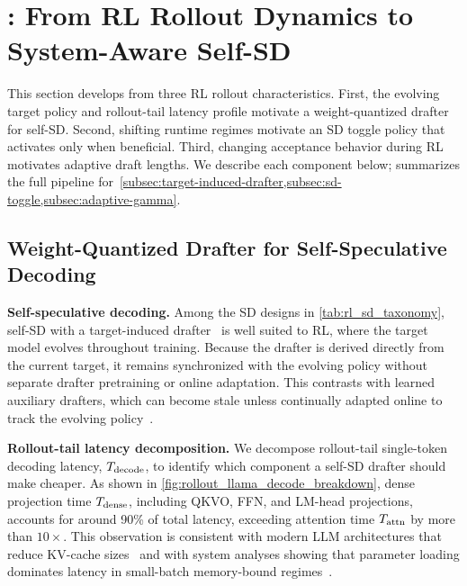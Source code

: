 

\section{{\methodtitle{}: From RL Rollout Dynamics to System-Aware Self-SD}}
\label{sec:method}

This section develops \textbf{\methodtitle{}} from three RL rollout characteristics.
First, the evolving target policy and rollout-tail latency profile motivate a weight-quantized drafter for self-SD.
Second, shifting runtime regimes motivate an SD toggle policy that activates only when beneficial.
Third, changing acceptance behavior during RL motivates adaptive draft lengths.
We describe each component below;  summarizes the full \methodtitle{} pipeline for~\cref{subsec:target-induced-drafter,subsec:sd-toggle,subsec:adaptive-gamma}.

\subsection{Weight-Quantized Drafter for Self-Speculative Decoding}
\label{subsec:target-induced-drafter}

\textbf{Self-speculative decoding.}
Among the SD designs in \cref{tab:rl_sd_taxonomy}, self-SD with a target-induced drafter~\citep{zhang2024draft,yue2026specattn,tiwari2025quantspec} is well suited to RL, where the target model evolves throughout training.
Because the drafter is derived directly from the current target, it remains synchronized with the evolving policy without separate drafter pretraining or online adaptation.
This contrasts with learned auxiliary drafters, which can become stale unless continually adapted online to track the evolving policy~\citep{zhang2025fastgrpo}.


\textbf{Rollout-tail latency decomposition.}
We decompose rollout-tail single-token decoding latency, $T_{\mathrm{decode}}$, to identify which component a self-SD drafter should make cheaper.
As shown in \cref{fig:rollout_llama_decode_breakdown}, dense projection time $T_{\mathrm{dense}}$, including QKVO, FFN, and LM-head projections, accounts for around 90\% of total latency, exceeding attention time $T_{\mathrm{attn}}$ by more than $10\times$.
This observation is consistent with modern LLM architectures that reduce KV-cache sizes~\citep{shazeer2019fast,ainslie2023gqa,liu2024deepseek,guo2025deepseek} and with system analyses showing that parameter loading dominates latency in small-batch memory-bound regimes~\citep{sadhukhan2024magicdec}.

